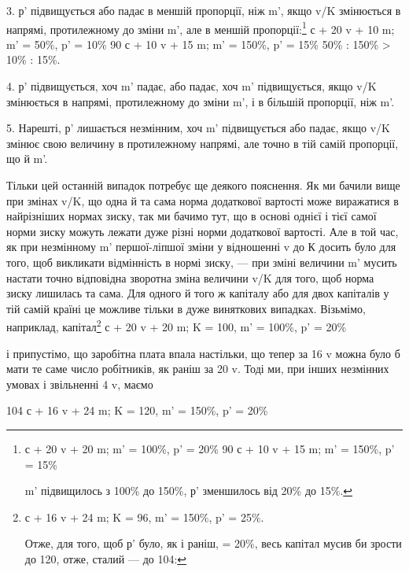 
3. р' підвищується або падає в меншій пропорції, ніж m',
якщо v/K змінюється в напрямі, протилежному до зміни m', але
в меншій пропорції:\footnote{
с + 20 v + 20 m; m' = 100\%, p' = 20\%
90 с + 10 v + 15 m; m' = 150\%, p' = 15\%

m' підвищилось з 100\% до 150\%, р' зменшилось від 20\% до 15\%.
} с + 20 v + 10 m; m' = 50\%, p' = 10\%
90 с + 10 v + 15 m; m' = 150\%, p' = 15\%
50\% : 150\% > 10\% : 15\%.

4. р' підвищується, хоч m' падає, або падає, хоч m' підвищується,
якщо v/K змінюється в напрямі, протилежному до зміни
m', і в більшій пропорції, ніж m'.

5. Нарешті, р' лишається незмінним, хоч m' підвищується або
падає, якщо v/K змінює свою величину в протилежному напрямі,
але точно в тій самій пропорції, що й m'.

Тільки цей останній випадок потребує ще деякого пояснення.
Як ми бачили вище при змінах v/K, що одна й та сама норма
додаткової вартості може виражатися в найрізніших нормах
зиску, так ми бачимо тут, що в основі однієї і тієї самої норми
зиску можуть лежати дуже різні норми додаткової вартості.
Але в той час, як при незмінному m' першої-ліпшої зміни у відношенні
v до К досить було для того, щоб викликати відмінність
в нормі зиску, — при зміні величини m' мусить настати точно
відповідна зворотна зміна величини v/K для того, щоб норма
зиску лишилась та сама. Для одного й того ж капіталу або для
двох капіталів у тій самій країні це можливе тільки в дуже
виняткових випадках. Візьмімо, наприклад, капітал\footnote{
с + 16 v + 24 m; K = 96, m' = 150\%, p' = 25\%.

Отже, для того, щоб р' було, як і раніш, = 20\%, весь капітал
мусив би зрости до 120, отже, сталий — до 104:
} с + 20 v + 20 m; K = 100, m' = 100\%, p' = 20\%

і припустімо, що заробітна плата впала настільки, що тепер за
16 v можна було б мати те саме число робітників, як раніш за
20 v. Тоді ми, при інших незмінних умовах і звільненні 4 v,
маємо

104 с + 16 v + 24 m; K = 120, m' = 150\%, p' = 20\%
